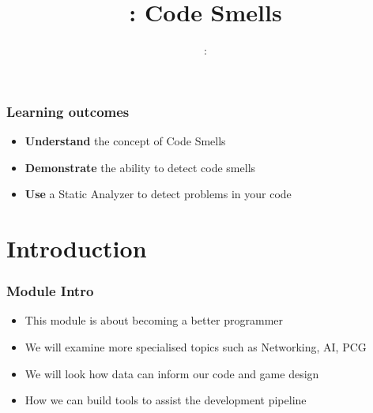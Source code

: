\usepackage{../../beamerthemeFalmouthGamesAcademy}
\usepackage{multimedia}
\graphicspath{ {../../} }


\usepackage[normalem]{ulem}
\usepackage{wasysym}

\usepackage{pdfpages}

\usetikzlibrary{arrows,automata}




\title{\sessionnumber: Code Smells}
\subtitle{\modulecode: \moduletitle}

\frame{\titlepage} 

\begin{frame}
	\frametitle{Learning outcomes}
	\begin{itemize}
		\item \textbf{Understand} the concept of Code Smells
		\item \textbf{Demonstrate} the ability to detect code smells
		\item \textbf{Use} a Static Analyzer to detect problems in your code
	\end{itemize}
\end{frame}

\section{Introduction}

\begin{frame}
	\frametitle{Module Intro}
	\begin{itemize}
		\item This module is about becoming a better programmer
		\item We will examine more specialised topics such as Networking, AI, PCG
		\item We will look how data can inform our code and game design
		\item How we can build tools to assist the development pipeline
	\end{itemize}
\end{frame}

